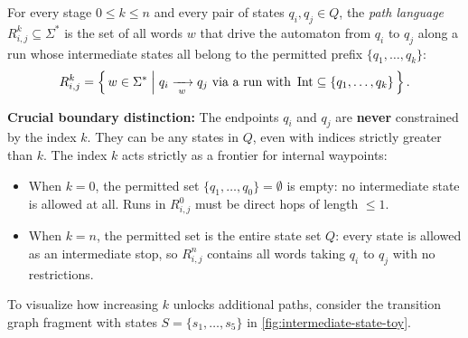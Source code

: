 \begin{definition}
\label{def:rijk}
For every stage $0 \le k \le n$ and every pair of states $q_i, q_j \in Q$, the \emph{path language} $R_{i,j}^k \subseteq \Sigma^*$ is the set of all words $w$ that drive the automaton from $q_i$ to $q_j$ along a run whose intermediate states all belong to the permitted prefix $\{q_1, \ldots, q_k\}$:
\[
  R_{i,j}^k = \left\{\, w \in \Sigma^* \;\middle|\; q_i \xrightarrow[{\;w\;}]{} q_j \text{ via a run with } \operatorname{Int} \subseteq \{q_1, \ldots, q_k\} \,\right\}.
\]
\end{definition}

\noindent
\textbf{Crucial boundary distinction:} The endpoints $q_i$ and $q_j$ are \textbf{never} constrained by the index $k$. They can be any states in $Q$, even with indices strictly greater than $k$. The index $k$ acts strictly as a frontier for internal waypoints:
\begin{itemize}[leftmargin=1.2em, nosep]
  \item When $k=0$, the permitted set $\{q_1, \ldots, q_0\} = \emptyset$ is empty: no intermediate state is allowed at all. Runs in $R_{i,j}^0$ must be direct hops of length $\le 1$.
  \item When $k=n$, the permitted set is the entire state set $Q$: every state is allowed as an intermediate stop, so $R_{i,j}^n$ contains all words taking $q_i$ to $q_j$ with no restrictions.
\end{itemize}


To visualize how increasing $k$ unlocks additional paths, consider the transition graph fragment with states $S = \{s_1, \ldots, s_5\}$ in \cref{fig:intermediate-state-toy}.

